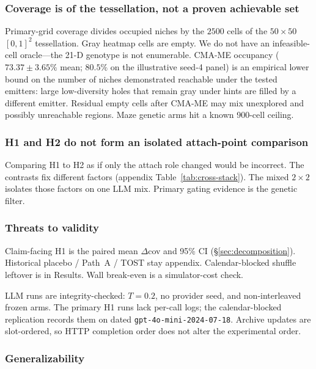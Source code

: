 \documentclass[preprint,12pt]{elsarticle}
\begin{document}
\subsubsection{Coverage is of the tessellation, not a proven achievable set}
\label{sec:coverage-support}

Primary-grid coverage divides occupied niches by the $2500$ cells of the $50\times50$ $[0,1]^2$ tessellation. Gray heatmap cells are empty. We do not have an infeasible-cell oracle---the 21-D genotype is not enumerable. CMA-ME occupancy ($73.37\pm3.65\%$ mean; $80.5\%$ on the illustrative seed-4 panel) is an empirical lower bound on the number of niches demonstrated reachable under the tested emitters: large low-diversity holes that remain gray under hints are filled by a different emitter. Residual empty cells after CMA-ME may mix unexplored and possibly unreachable regions. Maze genetic arms hit a known 900-cell ceiling.

\subsubsection{H1 and H2 do not form an isolated attach-point comparison}
\label{sec:cross-stack}

Comparing H1 to H2 as if only the attach role changed would be incorrect. The contrasts fix different factors (appendix Table~\ref{tab:cross-stack}). The mixed $2\times2$ isolates those factors on one LLM mix. Primary gating evidence is the genetic filter.

\subsubsection{Threats to validity}

Claim-facing H1 is the paired mean $\Delta$cov and 95\% CI (\S\ref{sec:decomposition}). Historical placebo / Path~A / TOST stay appendix. Calendar-blocked shuffle leftover is in Results. Wall break-even is a simulator-cost check.

LLM runs are integrity-checked: $T{=}0.2$, no provider seed, and non-interleaved frozen arms. The primary H1 runs lack per-call logs; the calendar-blocked replication records them on dated \texttt{gpt-4o-mini-2024-07-18}. Archive updates are slot-ordered, so HTTP completion order does not alter the experimental order.

\subsubsection{Generalizability}
\label{sec:generalizability}
\end{document}
